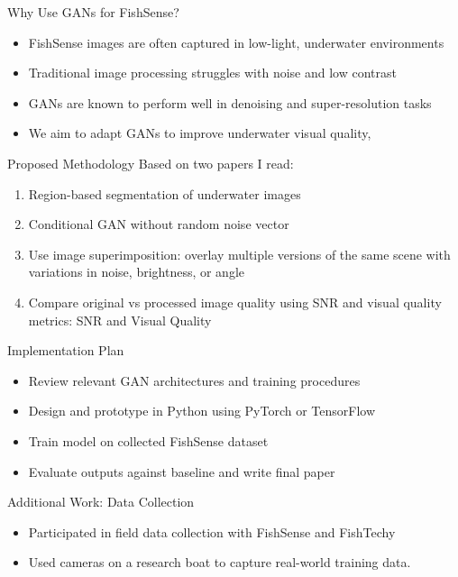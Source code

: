 \begin{frame}{Why Use GANs for FishSense?}
    \begin{itemize}
        \item FishSense images are often captured in low-light, underwater environments
        \item Traditional image processing struggles with noise and low contrast
        \item GANs are known to perform well in denoising and super-resolution tasks
        \item We aim to adapt GANs to improve underwater visual quality,
    \end{itemize}
\end{frame}

\begin{frame}{Proposed Methodology}
Based on two papers I read:
    \begin{enumerate}
        \item Region-based segmentation of underwater images
        \item Conditional GAN without random noise vector
        \item Use image superimposition: overlay multiple versions of the same scene with variations in noise, brightness, or angle
        \item Compare original vs processed image quality using SNR and visual quality metrics: SNR and Visual Quality
    \end{enumerate}
\end{frame}

\begin{frame}{Implementation Plan}
    \begin{itemize}
        \item Review relevant GAN architectures and training procedures
        \item Design and prototype in Python using PyTorch or TensorFlow
        \item Train model on collected FishSense dataset
        \item Evaluate outputs against baseline and write final paper
    \end{itemize}
\end{frame}

\begin{frame}{Additional Work: Data Collection}
    \begin{itemize}
        \item Participated in field data collection with FishSense and FishTechy
        \item Used cameras on a research boat to capture real-world training data.
    \end{itemize}
\end{frame}

